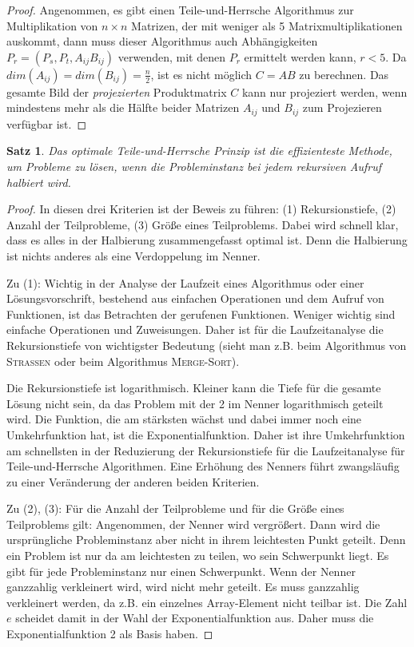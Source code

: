 \documentclass{scrartcl}
\newtheorem{satz}{Satz}[section]
\numberwithin{equation}{section}
\begin{document}
\begin{proof}
	Angenommen, es gibt einen Teile-und-Herrsche Algorithmus zur Multiplikation von $n \times n$ Matrizen, der mit weniger als 5 Matrixmultiplikationen auskommt, dann muss dieser Algorithmus auch Abhängigkeiten $P_r = (P_s, P_t, A_{ij}B_{ij})$ verwenden, mit denen $P_r$ ermittelt werden kann, $r < 5$. Da $dim(A_{ij}) = dim(B_{ij}) = \frac{n}{2}$, ist es nicht möglich $C = AB$ zu berechnen. Das gesamte Bild der \textit{projezierten} Produktmatrix $C$ kann nur projeziert werden, wenn mindestens mehr als die Hälfte beider Matrizen $A_{ij}$ und $B_{ij}$ zum Projezieren verfügbar ist.
\end{proof}
\begin{satz}
	Das optimale Teile-und-Herrsche Prinzip ist die effizienteste Methode, um Probleme zu lösen, wenn die Probleminstanz bei jedem rekursiven Aufruf halbiert wird. 
\end{satz}
\begin{proof}
	In diesen drei Kriterien ist der Beweis zu führen: (1) Rekursionstiefe, (2) Anzahl der Teilprobleme, (3) Größe eines Teilproblems. Dabei wird schnell klar, dass es alles in der Halbierung zusammengefasst optimal ist. Denn die Halbierung ist nichts anderes als eine Verdoppelung im Nenner.
	
	Zu (1): Wichtig in der Analyse der Laufzeit eines Algorithmus oder einer Lösungsvorschrift, bestehend aus einfachen Operationen und dem Aufruf von Funktionen, ist das Betrachten der gerufenen Funktionen. Weniger wichtig sind einfache Operationen und Zuweisungen. Daher ist für die Laufzeitanalyse die Rekursionstiefe von wichtigster Bedeutung (sieht man z.B. beim Algorithmus von \textsc{Strassen} oder beim Algorithmus \textsc{Merge-Sort}).
	
	Die Rekursionstiefe ist logarithmisch. Kleiner kann die Tiefe für die gesamte Lösung nicht sein, da das Problem mit der 2 im Nenner logarithmisch geteilt wird. Die Funktion, die am stärksten wächst und dabei immer noch eine Umkehrfunktion hat, ist die Exponentialfunktion. Daher ist ihre Umkehrfunktion am schnellsten in der Reduzierung der Rekursionstiefe für die Laufzeitanalyse für Teile-und-Herrsche Algorithmen. Eine Erhöhung des Nenners führt zwangsläufig zu einer Veränderung der anderen beiden Kriterien.
	
	Zu (2), (3): Für die Anzahl der Teilprobleme und für die Größe eines Teilproblems gilt: Angenommen, der Nenner wird vergrößert. Dann wird die ursprüngliche Probleminstanz aber nicht in ihrem leichtesten Punkt geteilt. Denn ein Problem ist nur da am leichtesten zu teilen, wo sein Schwerpunkt liegt. Es gibt für jede Probleminstanz nur einen Schwerpunkt. Wenn der Nenner ganzzahlig verkleinert wird, wird nicht mehr geteilt. Es muss ganzzahlig verkleinert werden, da z.B. ein einzelnes Array-Element nicht teilbar ist. Die Zahl $e$ scheidet damit in der Wahl der Exponentialfunktion aus. Daher muss die Exponentialfunktion 2 als Basis haben.
\end{proof}
\end{document}
